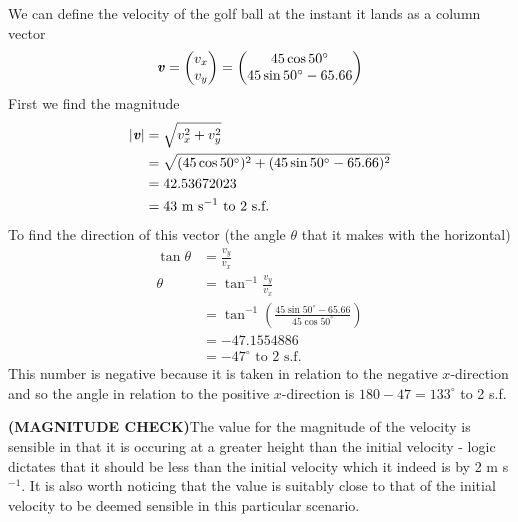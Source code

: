 \documentclass[a4paper,12pt]{article}
\numberwithin{equation}{section}
\begin{document}
\begin{question}
We can define the velocity of the golf ball at the instant it lands as a column vector
\[
\textbf{\textit{v}}=
\begin{pmatrix}
v_x\\
v_y
\end{pmatrix}
=
\begin{pmatrix}
45\cos50^\circ\\
45\sin50^\circ - 65.66
\end{pmatrix}
\]
First we find the magnitude
\begin{align*}
|\textbf{\textit{v}}| &= \sqrt{v_x^2+v_y^2}\\
&=\sqrt{(45\cos50^\circ)^2+(45\sin50^\circ - 65.66)^2}\\
&= 42.53672023\\
&=43\text{ m s}^{-1}\text{ to 2 s.f.}
\end{align*}
To find the direction of this vector (the angle $\theta$ that it makes with the horizontal)
\begin{align*}
\tan\theta &= \frac{v_y}{v_x}\\
\theta &=\tan^{-1}\frac{v_y}{v_x}\\
&=\tan^{-1}\left(\frac{45\sin50^\circ - 65.66}{45\cos50^\circ}\right)\\
&=-47.1554886\\
&=-47^\circ\text{ to 2 s.f.}
\end{align*}
This number is negative because it is taken in relation to the negative $x$-direction and so the angle in relation to the positive $x$-direction is $180-47=133^\circ$ to 2 s.f.

\textbf{(MAGNITUDE CHECK)}The value for the magnitude of the velocity is sensible in that it is occuring at a greater height than the initial velocity - logic dictates that it should be less than the initial velocity which it indeed is by 2 m s$^{-1}$. It is also worth noticing that the value is suitably close to that of the initial velocity to be deemed sensible in this particular scenario.
\end{question}

\newpage
\end{document}
